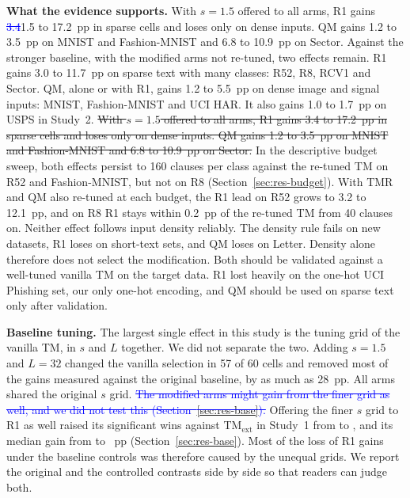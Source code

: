 \documentclass[preprint,12pt,times]{elsarticle}
\newcommand{\add}[1]{{\color{blue}#1}}
\newcommand{\del}[1]{\textcolor{blue}{\sout{#1}}}
\newcommand{\hadd}[1]{{\color{harel}#1}}
\newcommand{\hdel}[1]{\textcolor{harel}{\sout{#1}}}
\begin{document}
\textbf{What the evidence supports.} \hadd{With $s = 1.5$ offered to all arms, R1 gains \del{3.4}\add{1.5} to 17.2~pp in \ctlRbothsparseW{} sparse cells and loses only on dense inputs. QM gains 1.2 to 3.5~pp on MNIST and Fashion-MNIST and 6.8 to 10.9~pp on Sector.}
Against the stronger baseline, with the modified arms not re-tuned, two effects remain.
R1 gains 3.0 to 11.7~pp on sparse text with many classes: R52, R8, RCV1 and Sector.
QM, alone or with R1, gains 1.2 to 5.5~pp on dense image and signal inputs: MNIST, Fashion-MNIST and UCI HAR. It also gains 1.0 to 1.7~pp on USPS in Study~2.
\hdel{With $s = 1.5$ offered to all arms, R1 gains 3.4 to 17.2~pp in \ctlRbothsparseW{} sparse cells and loses only on dense inputs. QM gains 1.2 to 3.5~pp on MNIST and Fashion-MNIST and 6.8 to 10.9~pp on Sector.}
In the descriptive budget sweep, both effects persist to 160 clauses per class against the re-tuned TM on R52 and Fashion-MNIST, but not on R8 (Section~\ref{sec:res-budget}). \add{With TMR and QM also re-tuned at each budget, the R1 lead on R52 grows to 3.2 to 12.1~pp, and on R8 R1 stays within 0.2~pp of the re-tuned TM from 40 clauses on.}
Neither effect follows input density reliably.
The density rule fails on new datasets, R1 loses on short-text sets, and QM loses on Letter.
Density alone therefore does not select the modification. Both should be validated against a well-tuned vanilla TM on the target data.
R1 lost heavily on the one-hot UCI Phishing set, our only one-hot encoding, and QM should be used on sparse text only after validation.

\textbf{Baseline tuning.} The largest single effect in this study is the tuning grid of the vanilla TM, in $s$ and $L$ together. We did not separate the two.
Adding $s = 1.5$ and $L = 32$ changed the vanilla selection in 57 of 60 cells and removed most of the gains measured against the original baseline, by as much as 28~pp.
All arms shared the original $s$ grid.
\del{The modified arms might gain from the finer grid as well, and we did not test this (Section~\ref{sec:res-base}).}
\add{Offering the finer $s$ grid to R1 as well raised its significant wins against TM$_{\mathrm{ext}}$ in Study~1 from \ctlRextallW{} to \ctlRbothallW{}, and its median gain from \ctlRextallMed{} to \ctlRbothallMed{}~pp (Section~\ref{sec:res-base}).
Most of the loss of R1 gains under the baseline controls was therefore caused by the unequal grids.}
We report the original and the controlled contrasts side by side so that readers can judge both.
\end{document}
